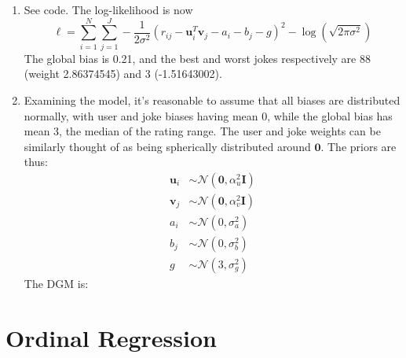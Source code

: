 \documentclass[submit]{harvardml}
\theoremstyle{plain}
\begin{document}
\begin{enumerate}[label=(\alph*)]
	\item See code. The log-likelihood is now
	\[
	\ell = \sum_{i=1}^N \sum_{j=1}^J -\frac{1}{2\sigma^2} (r_{ij} - \bm{u}_i^T\bm{v}_j - a_i - b_j - g)^2 - \log(\sqrt{2\pi\sigma^2})
	\]
	The global bias is 0.21, and the best and worst jokes respectively are 88 (weight 2.86374545) and	3 (-1.51643002).
	
	\item Examining the model, it's reasonable to assume that all biases are distributed normally, with user and joke biases having mean 0, while the global bias has mean 3, the median of the rating range. The user and joke weights can be similarly thought of as being spherically distributed around $\bm{0}$. The priors are thus:
	\begin{align*}
	\bm{u}_i&\sim\mathcal{N}(\bm{0}, \alpha_u^2\bm{I}) \\
	\bm{v}_j&\sim\mathcal{N}(\bm{0}, \alpha_v^2\bm{I}) \\
	a_i&\sim\mathcal{N}(0, \sigma_a^2) \\
	b_j&\sim\mathcal{N}(0, \sigma_b^2) \\
	g&\sim\mathcal{N}(3, \sigma_g^2)
	\end{align*}
	The DGM is:
	\begin{center}
	\end{center}
	
\end{enumerate}

\newpage
\section*{Ordinal Regression}
\end{document}
